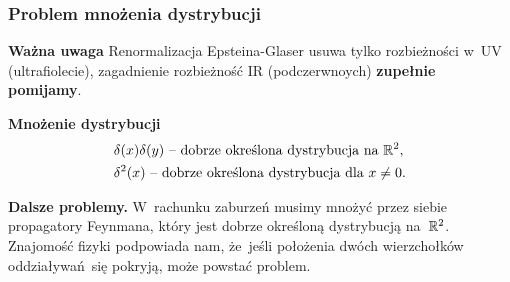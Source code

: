 \documentclass[10pt,t]{beamer}
\begin{document}
\begin{frame}
  \frametitle{Problem mnożenia dystrybucji}


  \textbf{Ważna uwaga}
  Renormalizacja Epsteina-Glaser usuwa tylko rozbieżności w~UV
  (ultrafiolecie), zagadnienie rozbieżność IR (podczerwnoych)
  \textbf{zupełnie pomijamy}.

  \vspace{\spaceFour}



  \textbf{Mnożenie dystrybucji}
  \begin{align}
    \label{eq:Remornalizacja-E-G-01-A}
    &\delta( x ) \delta( y ) \textrm{ -- dobrze określona dystrybucja na }
      \mathbb{R}^{ 2 }, \\
    \label{eq:Remornalizacja-E-G-01-B}
    &\delta^{ 2 }( x ) \textrm{ -- dobrze określona dystrybucja dla }
      x \neq 0.
  \end{align}

  \vspace{\spaceFour}



  \textbf{Dalsze problemy.}
  W~rachunku zaburzeń musimy mnożyć przez siebie propagatory Feynmana,
  który jest dobrze określoną dystrybucją na~$\mathbb{R}^{ 2 }$. Znajomość fizyki
  podpowiada nam, że~jeśli położenia dwóch wierzchołków
  oddziaływań~się pokryją, może powstać problem.

\end{frame}
\end{document}
